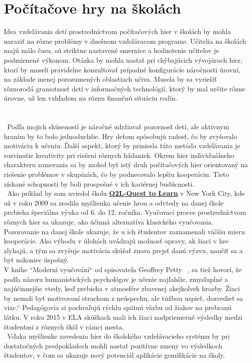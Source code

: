 \documentclass[10pt,twoside,slovak,a4paper]{article}
\begin{document}
\section{Počítačove hry na školách}\label{hry-na-skolach-hodiny-programovania}
Idea vzdelávania detí prostredníctvom počítačových hier v školách by mohla naraziť na 
rôzne problémy v dnešnom vzdelávacom programe. Učitelia na školách majú málo času, sú striktne 
nastavené smernice a hodnotenie učiteľov je podmienené výkonom. Otázka by mohla nastať pri chýbajúcich 
vývojároch hier, ktorí by museli pravidelne konzultovať prípadné konfigurácie náročnosti úrovní, na 
základe menej porozumených oblastiach učiva. Musela by sa vyriešiť rôznorodá gramotnosť detí v informačných 
technológií, ktorý by mal určite rôzne úrovne, už len vzhľadom na rôznu finančnú situáciu rodín.\\\\\\
\indent~Podľa mojich skúseností je náročné udržiavať pozornosť detí, ale aktívnym hraním by to bolo jednoduchšie. Hry 
deťom spôsobujú radosť, čo by zvyšovalo motiváciu k učeniu. Ďalší aspekt, ktorý by priniesla táto metóda vzdelávania 
je rozvinutie kreativity pri riešení rôznych hádaniek. Okrem hier individuálneho charakteru zamerania sa 
by mohol byť istý druh počítačových hier orientovaný na riešenie problémov v skupinách, čo by podnecovalo 
lepšiu kooperáciu. Tieto získané schopnosti by boli prospešné v ich kariérnej budúcnosti.\\
\indent~Ako príklad by som uviedol školu \textbf{\href{https://www.q2l.org/}{Q2L-Quest to Learn}} v New York City, kde už v roku 2009 sa 
zrodila myšlienka učenie hrou a odvtedy na danej škole prebieha špeciálna výuka od 6. do 12. ročníka. 
Vyučovací proces prostredníctvom rôznych hier sa ukazuje, ako účinná alternatíva klasického vyučovania.
Pozorovanie na danej škole ukazuje, že u ich študentov zaznamenali väčšiu mieru kooperácie. Ako výhodu v úlohách uvádzajú 
možnosť opravy, ak žiaci v hre zlyhajú, a tým sa zvyšuje motivácia skúšať znova prejsť danú výzvu, naučiť 
sa a byť nakoniec úspešný. \\
V knihe ``Moderní vyučování`` od spisovateľa Geoffrey Petty ~\cite{pettyEd}, sa tiež hovorí, že podľa názoru humanistických psychológov je učenie 
najľahšie, zmysluplné a najúčinnejšie vtedy, keď prebieha v atmosfére zbavenej akejkoľvek hrozby. Žiaci by nemali byť motivovaní strachom 
z neúspechu, ale túžbou uspieť, dozvedieť sa viac.“ Pedagógovia si pochvaľujú rýchlu spätnú väzbu od žiakov na prebranú látku. 
V roku 2015 v ELA skúškach mali ich žiaci nadpriemerné výsledky medzi študentmi z rôznych škôl v rámci mesta.\\
\indent~Vďaka myšlienke zavedenia hier do školského vzdelávacieho systému by pri dostatočných predpokladoch mohli nastať pozitívne 
zmeny vo výsledkoch študentov, v čom sa ukazuje nový potenciál aplikácie gemifikácie na školy.
\end{document}
